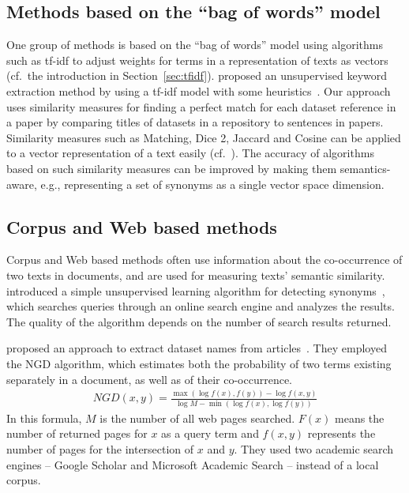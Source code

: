 \documentclass{IOS-Book-Article}
\begin{document}
\subsection{Methods based on the “bag of words” model}
One group of methods is based on the “bag of words” model using algorithms such as tf-idf to adjust weights for terms in a representation of texts as vectors (cf.\ the introduction in Section~\ref{sec:tfidf}).
\citeauthor{Lee2008} proposed an unsupervised keyword extraction method by using a tf-idf model with some heuristics~\citeyearpar{Lee2008}.
Our approach uses similarity measures for finding a perfect match for each dataset reference in a paper by comparing titles of datasets in a repository to sentences in papers.
Similarity measures such as Matching, Dice 2, Jaccard and Cosine can be applied to a vector representation of a text easily (cf.~\citet{ChristopherD1999}).
The accuracy of algorithms based on such similarity measures can be improved by making them semantics-aware, e.g., representing a set of synonyms as a single vector space dimension.

\subsection{Corpus and Web based methods}
Corpus and Web based methods often use information about the co-occurrence of two texts in documents, and are used for measuring texts' semantic similarity.
\citeauthor{Turney2001} introduced a simple unsupervised learning algorithm for detecting synonyms~\citeyearpar{Turney2001}, which searches queries through an online search engine and analyzes the results.
The quality of the algorithm depends on the number of search results returned.  

\citeauthor{sighal2013} proposed an approach to extract dataset names from articles~\citeyearpar{sighal2013}.
They employed the NGD algorithm, which estimates both the probability of two terms existing separately in a document, as well as of their co-occurrence. 
\begin{align*}
	\mathit{NGD}(x,y)=\frac{\max(\log f(x),f(y))-\log f(x,y)}{\log M -\min(\log f(x),\log f(y))}
\end{align*}
In this formula, $M$ is the number of all web pages searched.
$F(x)$ means the number of returned pages for $x$ as a query term and $f(x,y)$ represents the number of pages for the intersection of $x$ and $y$. 
They used two academic search engines -- Google Scholar and Microsoft Academic Search -- instead of a local corpus.
\end{document}
